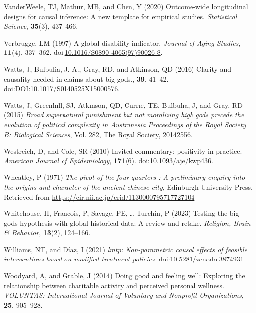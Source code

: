 \documentclass[
  single column]{article}
\newlength{\cslhangindent}
\newenvironment{CSLReferences}[2] %
 {\begin{list}{}{%
  \setlength{\itemindent}{0pt}
  \setlength{\leftmargin}{0pt}
  \setlength{\parsep}{0pt}
  \ifodd #1
   \setlength{\leftmargin}{\cslhangindent}
   \setlength{\itemindent}{-1\cslhangindent}
  \fi
  \setlength{\itemsep}{#2\baselineskip}}}
 {\end{list}}
\begin{document}
\begin{CSLReferences}{1}{0}
VanderWeele, TJ, Mathur, MB, and Chen, Y (2020) Outcome-wide
longitudinal designs for causal inference: A new template for empirical
studies. \emph{Statistical Science}, \textbf{35}(3), 437--466.

Verbrugge, LM (1997) A global disability indicator. \emph{Journal of
Aging Studies}, \textbf{11}(4), 337--362.
doi:\href{https://doi.org/10.1016/S0890-4065(97)90026-8}{10.1016/S0890-4065(97)90026-8}.

Watts, J, Bulbulia, J. A., Gray, RD, and Atkinson, QD (2016) Clarity and
causality needed in claims about big gods., \textbf{39}, 41--42.
doi:\href{https://doi.org/DOI:10.1017/S0140525X15000576}{DOI:10.1017/S0140525X15000576}.

Watts, J, Greenhill, SJ, Atkinson, QD, Currie, TE, Bulbulia, J, and
Gray, RD (2015) \emph{Broad supernatural punishment but not moralizing
high gods precede the evolution of political complexity in
{A}ustronesia} \emph{Proceedings of the Royal Society B: Biological
Sciences}, Vol. 282, The Royal Society, 20142556.

Westreich, D, and Cole, SR (2010) Invited commentary: positivity in
practice. \emph{American Journal of Epidemiology}, \textbf{171}(6).
doi:\href{https://doi.org/10.1093/aje/kwp436}{10.1093/aje/kwp436}.

Wheatley, P (1971) \emph{The pivot of the four quarters : A preliminary
enquiry into the origins and character of the ancient chinese city},
Edinburgh University Press. Retrieved from
\url{https://cir.nii.ac.jp/crid/1130000795717727104}

Whitehouse, H, Francois, P, Savage, PE, \ldots{} Turchin, P (2023)
Testing the big gods hypothesis with global historical data: A review
and retake. \emph{Religion, Brain \& Behavior}, \textbf{13}(2),
124--166.

Williams, NT, and Díaz, I (2021) \emph{{l}mtp: Non-parametric causal
effects of feasible interventions based on modified treatment policies}.
doi:\href{https://doi.org/10.5281/zenodo.3874931}{10.5281/zenodo.3874931}.

Woodyard, A, and Grable, J (2014) Doing good and feeling well: Exploring
the relationship between charitable activity and perceived personal
wellness. \emph{VOLUNTAS: International Journal of Voluntary and
Nonprofit Organizations}, \textbf{25}, 905--928.


\end{CSLReferences}
\end{document}
